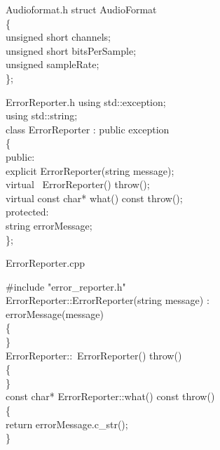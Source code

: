 \documentclass{beamer}
\begin{document}
\begin{frame}{Audioformat.h}
struct AudioFormat\\
\{\\
 \qquad   unsigned short channels;\\
   \qquad  unsigned short bitsPerSample;\\
    \qquad unsigned sampleRate;\\
\};\\
\end{frame}

\begin{frame}{ErrorReporter.h}
using std::exception;\\
using std::string;\\

class ErrorReporter : public exception\\
\{ \\
   \qquad  public:\\
   \qquad \qquad     explicit ErrorReporter(string message);\\
   \qquad \qquad   virtual ~ErrorReporter() throw();        \\

   \qquad \qquad	virtual const char* what() const throw();\\
   \qquad protected:\\
    \qquad\qquad  string errorMessage;\\
\}; \\

\end{frame}




\begin{frame}{ErrorReporter.cpp}

\#include "error\_reporter.h"\\

ErrorReporter::ErrorReporter(string message) :\\
   \qquad errorMessage(message) \\
\{ \\
\} \\

ErrorReporter::~ErrorReporter() throw() \\
\{ \\
\} \\
		
const char* ErrorReporter::what() const throw()\\
\{ \\
\qquad	return errorMessage.c\_str();\\
\} \\


\end{frame}
\end{document}
